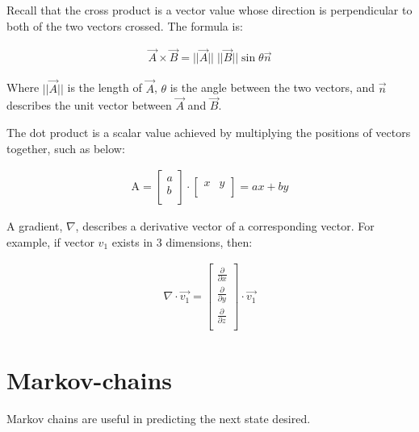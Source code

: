 \documentclass[12pt]{report}
\begin{document}
Recall that the cross product is a vector value whose direction is perpendicular to both of the two vectors crossed. The formula is:

\begin{equation} \label{crossproductformula}
\begin{split}
\vec{A} \times \vec{B} = ||\vec{A}|| \; ||\vec{B}|| \sin\theta \vec{n}
\end{split}
\end{equation}

Where $||\vec{A}||$ is the length of $\vec{A}$, $\theta$ is the angle between the two vectors, and $\vec{n}$ describes the unit vector between $\vec{A}$ and $\vec{B}$.\newline

The dot product is a scalar value achieved by multiplying the positions of vectors together, such as below: 

\begin{align}
\mathrm{A} =
\begin{bmatrix} %
 a  \\ 
 b  \\ 
\end{bmatrix}
\cdot
\begin{bmatrix} %
x  &  y    \\ 
\end{bmatrix}
= 
ax + by 
\end{align}

A gradient, $\nabla$, describes a derivative vector of a corresponding vector. For example, if vector $v_1$ exists in 3 dimensions, then: 


\begin{align}
\nabla \cdot \vec{v_1} = 
\begin{bmatrix} %
\frac{\partial}{\partial x}  \\ 
\frac{\partial}{\partial y}  \\ 
\frac{\partial}{\partial z}  \\
\end{bmatrix}
\cdot
\vec{v_1}
\end{align}


\section{Markov-chains} Markov chains are useful in predicting the next state desired. 
\end{document}
